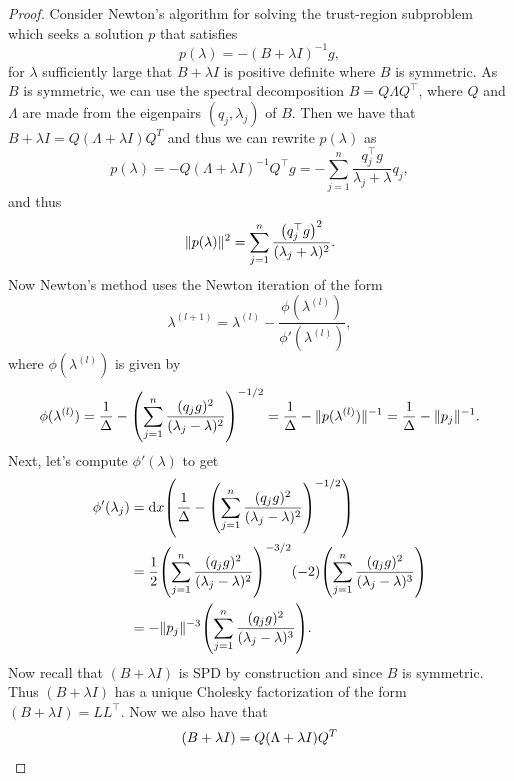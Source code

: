 \documentclass[12pt]{report}
\begin{document}
\begin{problem}
\begin{proof}
Consider Newton's algorithm for solving the trust-region subproblem which seeks a solution $p$ that satisfies
\begin{equation*}
    p(\lambda) = - (B + \lambda I)^{-1}g,
\end{equation*}
for $\lambda$ sufficiently large that $B + \lambda I$ is positive definite where $B$ is symmetric. As $B$ is symmetric, we can use the spectral decomposition $B = Q\Lambda Q^\top$, where $Q$ and $\Lambda$ are made from the eigenpairs $(q_j,\lambda_j)$ of $B$. Then we have that $B+\lambda I = Q(\Lambda + \lambda I)Q^T$ and thus we can rewrite $p(\lambda)$ as
\begin{equation*}
    p(\lambda) = -Q(\Lambda + \lambda I)^{-1}Q^\top g = - \sum_{j=1}^n \frac{q_j^\top g}{\lambda_j + \lambda}q_j,
\end{equation*}
and thus 
\begin{equation*}
    \|p(\lambda)\|^2 = \sum_{j=1}^n \frac{{\left(q_j^\top g\right)}^2}{(\lambda_j + \lambda)^2}.
\end{equation*}
Now Newton's method uses the Newton iteration of the form
\begin{equation*}
    \lambda^{(l+1)} = \lambda^{(l)} - \frac{\phi(\lambda^{(l)})}{\phi'(\lambda^{(l)})},
\end{equation*}
where $\phi(\lambda^{(l)})$ is given by
\begin{equation}\label{ASDASDADSA}
         \phi(\lambda^{(l)}) = \frac{1}{\Delta} - {\left(\sum_{j=1}^n \frac{(q_j g)^2}{(\lambda_j - \lambda)^2}\right)}^{-1/2} = \frac{1}{\Delta} - \|p(\lambda^{(l)})\|^{-1}= \frac{1}{\Delta} - \|p_j\|^{-1}.
\end{equation}
Next, let's compute $\phi'(\lambda)$ to get
\begin{align*}
    \phi'(\lambda_j) &= {\mathrm{d}} x {\left(\frac{1}{\Delta} - {\left(\sum_{j=1}^n \frac{(q_j g)^2}{(\lambda_j - \lambda)^2}\right)}^{-1/2}\right)}\\
    &= \frac{1}{2}{\left(\sum_{j=1}^n \frac{(q_j g)^2}{(\lambda_j - \lambda)^2}\right)}^{-3/2}(-2){\left(\sum_{j=1}^n \frac{(q_j g)^2}{(\lambda_j - \lambda)^3}\right)}\\
    &= -\|p_j\|^{-3}{\left(\sum_{j=1}^n \frac{(q_j g)^2}{(\lambda_j - \lambda)^3}\right)}.
\end{align*}
Now recall that $(B + \lambda I)$ is SPD by construction and since $B$ is symmetric. Thus $(B + \lambda I)$ has a unique Cholesky factorization of the form $(B + \lambda I) = LL^\top$. Now we also have that 
\begin{align*}
    \paren{B+\lambda I} &= Q(\Lambda + \lambda I)Q^T\\ 

\end{align*}
\end{proof}
\end{problem}
\end{document}
